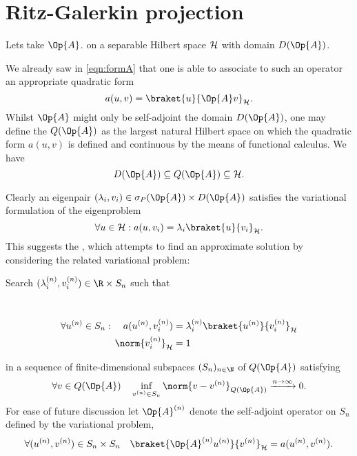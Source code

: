 \section{Ritz-Galerkin projection}
\label{sec:RitzGalerkin}






Lets take $\Op{A}$.
on a separable Hilbert space $\mathcal{H}$ with domain $D(\Op{A})$.


We already saw in \eqref{eqn:formA} that one is able
to associate to such an operator an appropriate quadratic form
\[ a(u, v) = \braket{u}{\Op{A} v}_\hilbert. \]
Whilst $\Op{A}$ might only be self-adjoint the domain $D(\Op{A})$,
one may define the  $Q(\Op{A})$ as the largest
natural Hilbert space on which the quadratic form $a(u, v)$
is defined and continuous by the means of functional calculus.
We have
\[ D(\Op{A}) \subseteq Q(\Op{A}) \subseteq \hilbert. \]

Clearly an eigenpair $(\lambda_i, v_i) \in \sigma_P(\Op{A}) \times D(\Op{A})$
satisfies the variational formulation of the eigenproblem
\[ \forall u \in \hilbert: a(u, v_i) = \lambda_i \braket{u}{v_i}_\hilbert. \]
This suggests the ,
which attempts to find an approximate solution by considering
the related variational problem:
\begin{center}
\begin{minipage}{0.9\textwidth}
	Search $(\lambda_i^{(n)}, v_i^{(n)}) \in \R \times S_n$ such that
\end{minipage} \\[-1.3em]
\begin{align}
	\label{eqn:varProblem1}
	\forall u^{(n)} \in S_n: \quad a(u^{(n)}, v_i^{(n)})
		&= \lambda_i^{(n)} \braket{u^{(n)}}{v_i^{(n)}}_\hilbert \\
	\label{eqn:varProblem2}
	\norm{v_i^{(n)}}_\hilbert &= 1
\end{align}
\end{center}
in a sequence of finite-dimensional subspaces $(S_n)_{n\in\N}$
of $Q(\Op{A})$ satisfying
\begin{equation}
	\forall v \in Q(\Op{A}) \quad \inf_{v^{(n)} \in S_n} \norm{v - v^{(n)}}_{Q(\Op{A})} \xrightarrow{n\to \infty} 0.
	\label{eqn:CondSubspaces}
\end{equation}
For ease of future discussion let $\Op{A}^{(n)}$ denote the self-adjoint
operator on $S_n$ defined by the variational problem, \ie
\[ \forall (u^{(n)}, v^{(n)}) \in S_n \times S_n \quad \braket{\Op{A}^{(n)} u^{(n)}}{v^{(n)}}_\hilbert = a(u^{(n)}, v^{(n)}). \]

